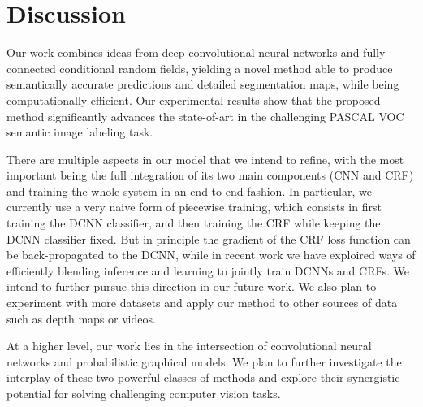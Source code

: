 \section{Discussion}
\label{sec:discussion}

Our work combines ideas from deep convolutional neural networks and
fully-connected conditional random fields, yielding a novel method able to
produce semantically accurate predictions and detailed segmentation maps,
while being computationally efficient. Our experimental results show that the
proposed method significantly advances the state-of-art in the challenging
PASCAL VOC semantic image labeling task.

There are multiple aspects in our model that we intend to refine, with the most important being the 
full integration of its two main components (CNN and CRF) and training the whole
system in an end-to-end fashion.  In particular, we currently use a very naive form of piecewise training, which consists in first training the DCNN classifier, and then training the CRF while keeping the DCNN classifier fixed. But in principle the gradient of the CRF loss function can be back-propagated to the DCNN, while in recent work \citet{chen2014learning} we have exploired ways of efficiently blending inference and learning to jointly train DCNNs and CRFs. We intend to further pursue this direction in our future work. 
We also plan to experiment with more datasets
and apply our method to other sources of data such as depth maps or videos.

At a higher level, our work lies in the intersection of convolutional neural
networks and probabilistic graphical models. We plan to further investigate
the interplay of these two powerful classes of methods and explore their
synergistic potential for solving challenging computer vision tasks.
